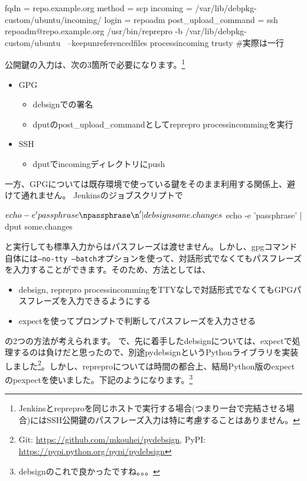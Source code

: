 \documentclass[mingoth,a4paper]{jsarticle}
\begin{document}
\begin{commandline}
[trusty]
fqdn                    = repo.example.org
method                  = scp
incoming                = /var/lib/debpkg-custom/ubuntu/incoming/
login                   = repoadm
post_upload_command     = ssh repoadm@repo.example.org /usr/bin/reprepro -b /var/lib/debpkg-custom/ubuntu \
--keepunreferencedfiles processincoming trusty #実際は一行
\end{commandline}

公開鍵の入力は、次の3箇所で必要になります。\footnote{Jenkinsとrepreproを同じホストで実行する場合(つまり一台で完結させる場合)にはSSH公開鍵のパスフレーズ入力は特に考慮することはありません。}

\begin{itemize}
  \item GPG
    \begin{itemize}
    \item[5.] debsignでの署名
    \item[6-2.] dputのpost\_upload\_commandとしてreprepro processincommingを実行
    \end{itemize}
  \item SSH
    \begin{itemize}
    \item[6-1.] dputでincomingディレクトリにpush
    \end{itemize}
\end{itemize}

一方、GPGについては既存環境で使っている鍵をそのまま利用する関係上、避けて通れません。
Jenkinsのジョブスクリプトで

\begin{commandline}
$ echo -e 'passphrase\npassphrase\n' | debsign some.changes
$ echo -e 'passphrase\npassphrase\n' | dput some.changes
\end{commandline}

と実行しても標準入力からはパスフレーズは渡せません。しかし、gpgコマンド自体には\texttt{--no-tty --batch}オプションを使って、対話形式でなくてもパスフレーズを入力することができます。そのため、方法としては、
\begin{itemize}
  \item debsign, reprepro processincommingをTTYなしで対話形式でなくてもGPGパスフレーズを入力できるようにする
  \item expectを使ってプロンプトで判断してパスフレーズを入力させる
\end{itemize}

の2つの方法が考えられます。
で、先に着手したdebsignについては、expectで処理するのは負けだと思ったので、別途pydebsignというPythonライブラリを実装しました\footnote{Git: \url{https://github.com/mkouhei/pydebsign}, PyPI: \url{https://pypi.python.org/pypi/pydebsign}}。しかし、repreproについては時間の都合上、結局Python版のexpectのpexpectを使いました。下記のようになります。\footnote{debsignのこれで良かったですね。。。}
\end{document}
